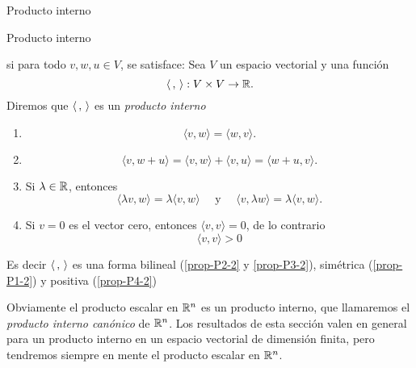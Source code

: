 \begin{chapter}{Producto interno}
\begin{section}{Producto interno}
        \begin{definicion}si para todo $v, w, u \in V$, se satisface:
             Sea $V$  un espacio  vectorial y  una función
            \begin{equation*}
            \langle \,,\,\rangle: V \times V \to \mathbb R .
            \end{equation*}
            Diremos que $\langle \,,\,\rangle$ es un \textit{producto interno} 
            \begin{enumerate}[label=\textbf{P\arabic*.},ref=P\arabic*]
                \item\label{prop-P1-2}
                \begin{equation*}
                    \langle v , w \rangle = \langle w , v \rangle.
                \end{equation*} 	
                \item\label{prop-P2-2} 
                \begin{equation*}
                \langle v , w + u \rangle =\langle v , w \rangle + \langle v , u \rangle = \langle w +u , v \rangle.
                \end{equation*}
                \item\label{prop-P3-2}  Si $\lambda \in \mathbb R$, entonces 
                \begin{equation*}
                \langle \lambda v , w \rangle = \lambda \langle v , w \rangle \quad \text{ y } \quad  \langle v , \lambda w \rangle = \lambda \langle v , w \rangle.
                \end{equation*}
                \item\label{prop-P4-2} Si $v=0$ es el vector cero, entonces $\langle v , v \rangle =0$,  de lo contrario
                \begin{equation*}
                \langle v , v \rangle >0
                \end{equation*}
            \end{enumerate}
            Es decir  $\langle \,,\,\rangle$ es una forma bilineal (\ref{prop-P2-2} y \ref{prop-P3-2}),  simétrica (\ref{prop-P1-2}) y positiva (\ref{prop-P4-2})
        \end{definicion}
    
        
        Obviamente el producto escalar en $\mathbb R^n$  es un producto interno,  que llamaremos  el  \textit{producto interno canónico} de $\mathbb R^n$. Los resultados de esta sección valen en general para un producto interno en un espacio vectorial de dimensión finita, pero tendremos siempre en mente el producto escalar en $\mathbb R^n$. 


\end{section}
\end{chapter}
